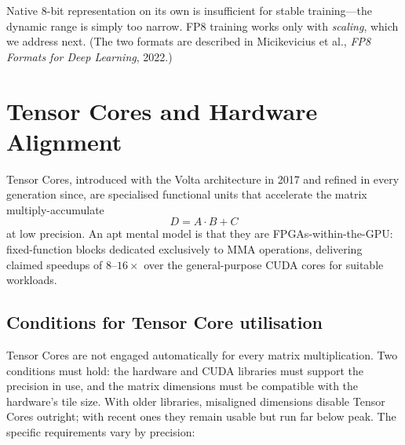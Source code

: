\documentclass[11pt,a4paper]{article}
\theoremstyle{definition}
\theoremstyle{remark}
\theoremstyle{plain}
\begin{document}
Native $8$-bit representation on its own is insufficient for stable
training---the dynamic range is simply too narrow. FP8 training works
only with \emph{scaling}, which we address next. (The two formats are
described in Micikevicius et al., \emph{FP8 Formats for Deep Learning},
2022.)

\section{Tensor Cores and Hardware Alignment}

Tensor Cores, introduced with the Volta architecture in 2017 and refined
in every generation since, are specialised functional units that
accelerate the matrix multiply-accumulate
\begin{equation}
D = A \cdot B + C
\end{equation}
at low precision. An apt mental model is that they are
FPGAs-within-the-GPU: fixed-function blocks dedicated exclusively to MMA
operations, delivering claimed speedups of $8$--$16\times$ over the
general-purpose CUDA cores for suitable workloads.

\subsection{Conditions for Tensor Core utilisation}

Tensor Cores are not engaged automatically for every matrix
multiplication. Two conditions must hold: the hardware and CUDA libraries
must support the precision in use, and the matrix dimensions must be
compatible with the hardware's tile size. With older libraries, misaligned
dimensions disable Tensor Cores outright; with recent ones they remain
usable but run far below peak. The specific requirements vary by
precision:
\end{document}
